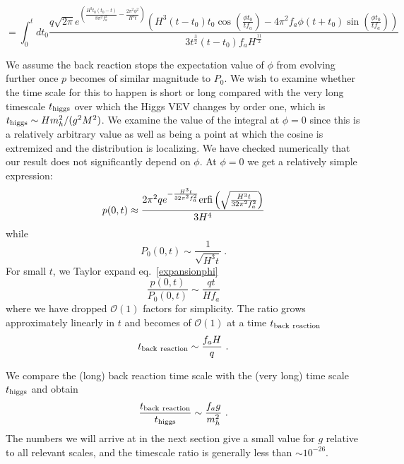 \documentclass[12pt,aps,prd,showpacs,notitlepage,nofootinbib]{revtex4-1}
\newcommand{\beq}{\begin{equation}}
\newcommand{\eeq}{\end{equation}}
\begin{document}
\beq
= \int_0^t dt_0 \frac{q \sqrt{2\pi}e^{\left(\frac{H^3 t_0 \left(t_0-t\right)}{8 \pi ^2 f_a^2}-\frac{2 \pi ^2 \phi^2}{H^3 t}\right)} \left(H^3  \left(t-t_0\right) t_0 \cos \left(\frac{\phi t_0}{tf_a}\right)-4 \pi ^2 f_a \phi \left(t+t_0\right) \sin \left(\frac{\phi t_0}{tf_a}\right)\right)}{3 t^{\frac32}(t-t_0)f_a H^{\frac{11}{2}} }                                                                                           \eeq
 

  We assume the back reaction stops the expectation value of $\phi$ from evolving further once $p$ becomes of similar magnitude to $P_0$. We wish to examine whether the time scale for this to happen is short or long compared with the very long timescale $t_{\rm higgs}$ over which the Higgs VEV changes by order one, which is $t_{\rm higgs}\sim    H m_h^2/(g^2 M^2)$.    We examine the value of the integral at $\phi=0$ since this is a relatively arbitrary value  as well as being a point at which the cosine is extremized and the distribution is localizing. We have checked numerically that our result does not significantly depend   on $\phi$. At $\phi=0$ we get a relatively simple expression:
\beq \label{expansionphi}
   p(0,t) \approx  \frac{2\pi^2  q e^{-\frac{H^3 t}{32\pi^2 f_a^2}}{\rm  erfi}\left(\sqrt{\frac{H^3 t}{32\pi^2 f_a^2}}\right) }{ 3  H^4 }\eeq
   while 
   \beq P_0(0,t)\sim \frac{1}{\sqrt{H^3 t}} \ .\eeq
   For small $t$, we Taylor expand eq.~\ref{expansionphi}
   \beq\frac{  p(0,t) }{P_0(0,t)}\sim \frac{q t  }{ H f_a } \eeq
   where we have dropped $\mathcal{O}(1)$ factors for simplicity.
  The ratio  grows approximately linearly in $t$ and becomes of $\mathcal{O}(1)$ at a time $t_{\rm back\ reaction}$
  \beq
 t_{\rm back\ reaction} \sim \frac{f_a H}{q } \ . \eeq 
   
  We compare the (long) back reaction time scale with the (very long) time scale $ t_{\rm higgs}$   and obtain
\beq\frac{ t_{\rm back\ reaction} }{ t_{\rm higgs} }\sim \frac{f_a g}{ m_h^2}\ . \eeq   The numbers we will arrive at in the next section give a small value for $g$ relative to all relevant scales, and the timescale ratio is generally less than $\sim 10^{-26}$.
  
   
   
\end{document}
